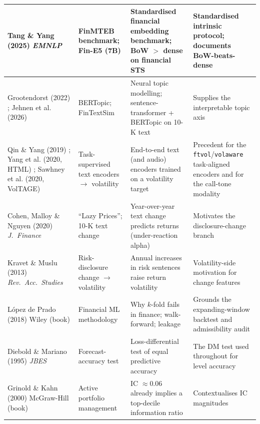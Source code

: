 \documentclass[logo,msc,ai]{infthesis}        %
\begin{document}
{\begin{longtable}{@{}L{2.4cm}L{2.6cm}L{3.7cm}L{3.7cm}@{}}
Tang \& Yang (2025) \cite{tang-yang-2025-finmteb}\newline \textit{EMNLP} &
FinMTEB benchmark; Fin-E5 (7B) &
Standardised financial embedding benchmark; BoW $>$ dense on financial STS &
Standardised intrinsic protocol; documents BoW-beats-dense \\
\hline

Grootendorst (2022) \cite{grootendorst2022bertopic}; Jehnen et al. (2026) \cite{jehnen2026fintextsim} &
BERTopic; FinTextSim &
Neural topic modelling; sentence-transformer + BERTopic on 10-K text &
Supplies the interpretable topic axis \\
\hline

Qin \& Yang (2019) \cite{qin2019you}; Yang et al. (2020, HTML) \cite{yang2020html}; Sawhney et al. (2020, VolTAGE) \cite{sawhney2020voltage} &
Task-supervised text encoders $\rightarrow$ volatility &
End-to-end text (and audio) encoders trained on a volatility target &
Precedent for the \texttt{ftvol}/\texttt{volaware} task-aligned encoders and for the call-tone modality \\
\hline

Cohen, Malloy \& Nguyen (2020) \cite{cohen2020lazy}\newline \textit{J.\ Finance} &
``Lazy Prices''; 10-K text change &
Year-over-year text change predicts returns (under-reaction alpha) &
Motivates the disclosure-change branch \\
\hline

Kravet \& Muslu (2013) \cite{kravet2013textual}\newline \textit{Rev.\ Acc.\ Studies} &
Risk-disclosure change $\rightarrow$ volatility &
Annual increases in risk sentences raise return volatility &
Volatility-side motivation for change features \\
\hline

López de Prado (2018) \cite{de2018advances}\newline Wiley (book) &
Financial ML methodology &
Why $k$-fold fails in finance; walk-forward; leakage &
Grounds the expanding-window backtest and admissibility audit \\
\hline

Diebold \& Mariano (1995) \cite{diebold1995comparing}\newline \textit{JBES} &
Forecast-accuracy test &
Loss-differential test of equal predictive accuracy &
The DM test used throughout for level accuracy \\
\hline

Grinold \& Kahn (2000) \cite{grinold2000active}\newline McGraw-Hill (book) &
Active portfolio management &
IC $\approx 0.06$ already implies a top-decile information ratio &
Contextualises IC magnitudes \\
\hline


\end{longtable}}
\end{document}
